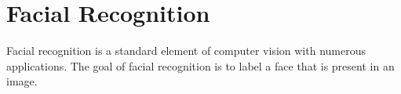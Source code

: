 \section{Facial Recognition}
  Facial recognition is a standard element of computer vision with numerous applications.
  The goal of facial recognition is to label a face that is present in an image.
  
  
